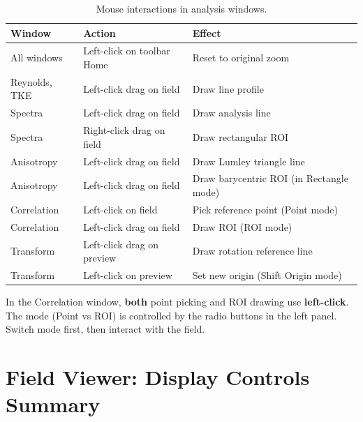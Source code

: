 \documentclass[11pt, a4paper]{report}
\begin{document}
\begin{table}[htbp]
\centering
\caption{Mouse interactions in analysis windows.}
\begin{tabular}{lp{4cm}p{6.5cm}}
\toprule
\textbf{Window} & \textbf{Action} & \textbf{Effect} \\
\midrule
All windows       & Left-click on toolbar Home & Reset to original zoom \\
Reynolds, TKE     & Left-click drag on field & Draw line profile \\
Spectra           & Left-click drag on field & Draw analysis line \\
Spectra           & Right-click drag on field & Draw rectangular ROI \\
Anisotropy        & Left-click drag on field & Draw Lumley triangle line \\
Anisotropy        & Left-click drag on field & Draw barycentric ROI (in Rectangle mode) \\
Correlation       & Left-click on field & Pick reference point (Point mode) \\
Correlation       & Left-click drag on field & Draw ROI (ROI mode) \\
Transform         & Left-click drag on preview & Draw rotation reference line \\
Transform         & Left-click on preview & Set new origin (Shift Origin mode) \\
\bottomrule
\end{tabular}
\end{table}

\begin{notebox}
In the Correlation window, \textbf{both} point picking and ROI drawing use \textbf{left-click}. The mode (Point vs ROI) is controlled by the radio buttons in the left panel. Switch mode first, then interact with the field.
\end{notebox}

\section{Field Viewer: Display Controls Summary}
\end{document}
